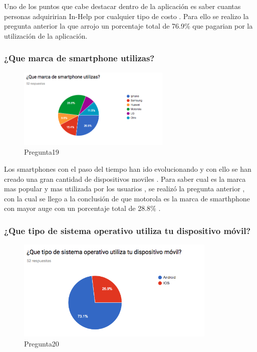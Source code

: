 Uno de los puntos que cabe destacar dentro de la aplicación es saber cuantas personas adquiririan In-Help por cualquier tipo de costo . Para ello se realizo la pregunta anterior la que arrojo un porcentaje total de 76.9\% que pagarian por la utilización de la aplicación.

\subsubsection{¿Que marca de smartphone utilizas?}

\begin{figure}[htbp!]
	\begin{center}
		\includegraphics[width=0.65\textwidth]{DisenoEstructura/imagenes/Pregunta19}
		\caption{Pregunta19}
		\label{DE/FO/Pregunta19}
	\end{center}
\end{figure}

Los smartphones con el paso del tiempo han ido evolucionando y con ello se han creado una gran cantidad de dispositivos moviles . Para saber cual es la marca mas popular y mas utilizada por los usuarios , se realizó la pregunta anterior , con la cual se llego a la conclusión de que motorola es la marca de smarthphone con mayor auge con un porcentaje total de 28.8\% . \\

\subsubsection{¿Que tipo de sistema operativo utiliza tu dispositivo móvil?}

\begin{figure}[htbp!]
	\begin{center}
		\includegraphics[width=0.85\textwidth]{DisenoEstructura/imagenes/Pregunta20}
		\caption{Pregunta20}
		\label{DE/FO/Pregunta20}
	\end{center}
\end{figure}

